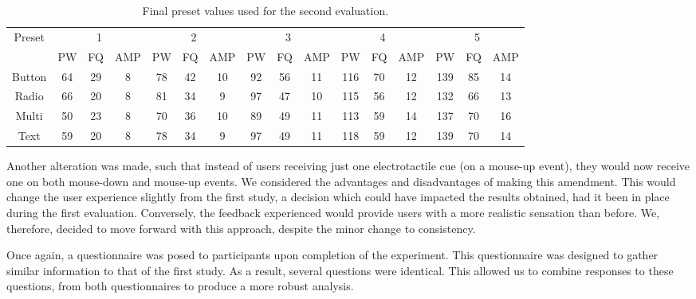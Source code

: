 \documentclass{mpaper}
\begin{document}
\begin{table}
\centering
\begin{tabular}{c|ccc|ccc|ccc|ccc|ccc}
\multirow{2}{*}{Preset} & \multicolumn{3}{c|}{1} & \multicolumn{3}{c|}{2} & \multicolumn{3}{c|}{3} & \multicolumn{3}{c|}{4} & \multicolumn{3}{c}{5} \\ \cline{2-16} 
                        & PW    & FQ    & AMP    & PW    & FQ    & AMP    & PW    & FQ    & AMP    & PW     & FQ    & AMP   & PW     & FQ   & AMP   \\ \hline
Button                  & 64    & 29    & 8      & 78    & 42    & 10     & 92    & 56    & 11     & 116    & 70    & 12    & 139    & 85   & 14    \\
Radio                   & 66    & 20    & 8      & 81    & 34    & 9      & 97    & 47    & 10     & 115    & 56    & 12    & 132    & 66   & 13    \\
Multi                   & 50    & 23    & 8      & 70    & 36    & 10     & 89    & 49    & 11     & 113    & 59    & 14    & 137    & 70   & 16    \\
Text                    & 59    & 20    & 8      & 78    & 34    & 9      & 97    & 49    & 11     & 118    & 59    & 12    & 139    & 70   & 14   
\end{tabular}
\caption{\label{tab:presets}Final preset values used for the second evaluation.}
\end{table}

Another alteration was made, such that instead of users receiving just one electrotactile cue (on a mouse-up event), they would now receive one on both mouse-down and mouse-up events. We considered the advantages and disadvantages of making this amendment. This would change the user experience slightly from the first study, a decision which could have impacted the results obtained, had it been in place during the first evaluation. Conversely, the feedback experienced would provide users with a more realistic sensation than before. We, therefore, decided to move forward with this approach, despite the minor change to consistency.

Once again, a questionnaire was posed to participants upon completion of the experiment. This questionnaire was designed to gather similar information to that of the first study. As a result, several questions were identical. This allowed us to combine responses to these questions, from both questionnaires to produce a more robust analysis.
\end{document}
